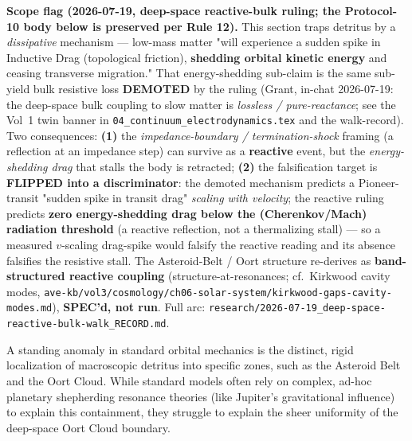 \noindent\textbf{Scope flag (2026-07-19, deep-space reactive-bulk ruling; the Protocol-10 body below is preserved per Rule 12).} This section traps detritus by a \emph{dissipative} mechanism --- low-mass matter "will experience a sudden spike in Inductive Drag (topological friction), \textbf{shedding orbital kinetic energy} and ceasing transverse migration." That energy-shedding sub-claim is the same sub-yield bulk resistive loss \textbf{DEMOTED} by the ruling (Grant, in-chat 2026-07-19: the deep-space bulk coupling to slow matter is \emph{lossless / pure-reactance}; see the Vol~1 twin banner in \texttt{04\_continuum\_electrodynamics.tex} and the walk-record). Two consequences: \textbf{(1)} the \emph{impedance-boundary / termination-shock} framing (a reflection at an impedance step) can survive as a \textbf{reactive} event, but the \emph{energy-shedding drag} that stalls the body is retracted; \textbf{(2)} the falsification target is \textbf{FLIPPED into a discriminator}: the demoted mechanism predicts a Pioneer-transit "sudden spike in transit drag" \emph{scaling with velocity}; the reactive ruling predicts \textbf{zero energy-shedding drag below the (Cherenkov/Mach) radiation threshold} (a reactive reflection, not a thermalizing stall) --- so a measured $v$-scaling drag-spike would falsify the reactive reading and its absence falsifies the resistive stall. The Asteroid-Belt / Oort structure re-derives as \textbf{band-structured reactive coupling} (structure-at-resonances; cf.\ Kirkwood cavity modes, \texttt{ave-kb/vol3/cosmology/ch06-solar-system/kirkwood-gaps-cavity-modes.md}), \textbf{SPEC'd, not run}. Full arc: \texttt{research/2026-07-19\_deep-space-reactive-bulk-walk\_RECORD.md}.

A standing anomaly in standard orbital mechanics is the distinct, rigid localization of macroscopic detritus into specific zones, such as the Asteroid Belt and the Oort Cloud. While standard models often rely on complex, ad-hoc planetary shepherding resonance theories (like Jupiter's gravitational influence) to explain this containment, they struggle to explain the sheer uniformity of the deep-space Oort Cloud boundary.

